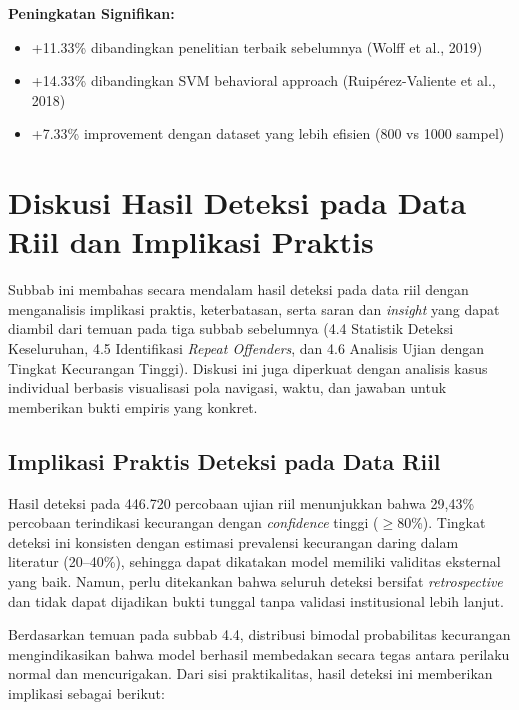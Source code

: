 \textbf{Peningkatan Signifikan:}
\begin{itemize}
    \item +11.33\% dibandingkan penelitian terbaik sebelumnya (Wolff et al., 2019)
    \item +14.33\% dibandingkan SVM behavioral approach (Ruip\'{e}rez-Valiente et al., 2018)
    \item +7.33\% improvement dengan dataset yang lebih efisien (800 vs 1000 sampel)
\end{itemize}

\section{Diskusi Hasil Deteksi pada Data Riil dan Implikasi Praktis}
\label{sec:diskusiDeteksiRiil}

Subbab ini membahas secara mendalam hasil deteksi pada data riil dengan menganalisis implikasi praktis, keterbatasan, serta saran dan \textit{insight} yang dapat diambil dari temuan pada tiga subbab sebelumnya (4.4 Statistik Deteksi Keseluruhan, 4.5 Identifikasi \textit{Repeat Offenders}, dan 4.6 Analisis Ujian dengan Tingkat Kecurangan Tinggi). Diskusi ini juga diperkuat dengan analisis kasus individual berbasis visualisasi pola navigasi, waktu, dan jawaban untuk memberikan bukti empiris yang konkret.

\subsection{Implikasi Praktis Deteksi pada Data Riil}
\label{subsec:implikasiPraktisRiil}

Hasil deteksi pada 446.720 percobaan ujian riil menunjukkan bahwa 29,43\% percobaan terindikasi kecurangan dengan \textit{confidence} tinggi ($\geq$80\%). Tingkat deteksi ini konsisten dengan estimasi prevalensi kecurangan daring dalam literatur (20--40\%), sehingga dapat dikatakan model memiliki validitas eksternal yang baik. Namun, perlu ditekankan bahwa seluruh deteksi bersifat \textit{retrospective} dan tidak dapat dijadikan bukti tunggal tanpa validasi institusional lebih lanjut.

Berdasarkan temuan pada subbab 4.4, distribusi bimodal probabilitas kecurangan mengindikasikan bahwa model berhasil membedakan secara tegas antara perilaku normal dan mencurigakan. Dari sisi praktikalitas, hasil deteksi ini memberikan implikasi sebagai berikut:

